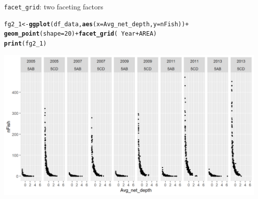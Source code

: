 \documentclass{beamer}\usepackage[]{graphicx}\usepackage[]{color}
\makeatletter
\newcommand{\hlnum}[1]{\textcolor[rgb]{0.686,0.059,0.569}{#1}}%
\newcommand{\hlopt}[1]{\textcolor[rgb]{0,0,0}{#1}}%
\newcommand{\hlstd}[1]{\textcolor[rgb]{0.345,0.345,0.345}{#1}}%
\newcommand{\hlkwb}[1]{\textcolor[rgb]{0.69,0.353,0.396}{#1}}%
\newcommand{\hlkwc}[1]{\textcolor[rgb]{0.333,0.667,0.333}{#1}}%
\newcommand{\hlkwd}[1]{\textcolor[rgb]{0.737,0.353,0.396}{\textbf{#1}}}%
\newenvironment{kframe}{%
 \def\at@end@of@kframe{}%
 \ifinner\ifhmode%
  \def\at@end@of@kframe{\end{minipage}}%
  \begin{minipage}{\columnwidth}%
 \fi\fi%
 \def\FrameCommand##1{\hskip\@totalleftmargin \hskip-\fboxsep
 \colorbox{shadecolor}{##1}\hskip-\fboxsep
     \hskip-\linewidth \hskip-\@totalleftmargin \hskip\columnwidth}%
 \MakeFramed {\advance\hsize-\width
   \@totalleftmargin\z@ \linewidth\hsize
   \@setminipage}}%
 {\par\unskip\endMakeFramed%
 \at@end@of@kframe}
\newenvironment{knitrout}{}{} %
\makeatother
\begin{document}
\begin{frame}[fragile]{\lstinline{facet_grid}: two faceting factors}
\begin{knitrout}\footnotesize
{}\color{fgcolor}\begin{kframe}
\begin{alltt}
\hlstd{fg2_1} \hlkwb{<-} \hlkwd{ggplot}\hlstd{(df_data,} \hlkwd{aes}\hlstd{(}\hlkwc{x}\hlstd{=Avg_net_depth,} \hlkwc{y}\hlstd{=nFish))} \hlopt{+}
  \hlkwd{geom_point}\hlstd{(}\hlkwc{shape}\hlstd{=}\hlnum{20}\hlstd{)} \hlopt{+} \hlkwd{facet_grid}\hlstd{(}\hlopt{~} \hlstd{Year} \hlopt{+} \hlstd{AREA)}
\hlkwd{print}\hlstd{(fg2_1)}
\end{alltt}
\end{kframe}

{\centering \includegraphics[width=.9\linewidth]{figure/facet_grid_4-1} 

}



\end{knitrout}
\end{frame}
\end{document}
